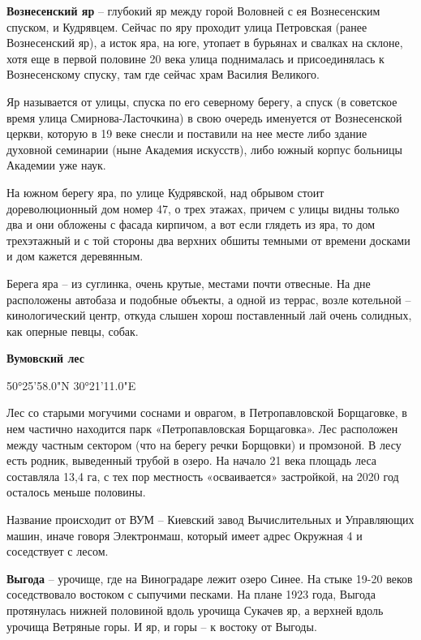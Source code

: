 \medskip

\textbf{Вознесенский яр} – глубокий яр между горой Воловней с ея Вознесенским спуском, и Кудрявцем. Сейчас по яру проходит улица Петровская (ранее Вознесенский яр), а исток яра, на юге, утопает в бурьянах и свалках на склоне, хотя еще в первой половине 20 века улица поднималась и присоединялась к Вознесенскому спуску, там где сейчас храм Василия Великого. 

Яр называется от улицы, спуска по его северному берегу, а спуск (в советское время улица Смирнова-Ласточкина) в свою очередь именуется от Вознесенской церкви, которую в 19 веке снесли и поставили на нее месте либо здание духовной семинарии (ныне Академия искусств), либо южный корпус больницы Академии уже наук.

На южном берегу яра, по улице Кудрявской, над обрывом стоит дореволюционный дом номер 47, о трех этажах, причем с улицы видны только два и они обложены с фасада кирпичом, а вот если глядеть из яра, то дом трехэтажный и с той стороны два верхних обшиты темными от времени досками и дом кажется деревянным.

Берега яра – из суглинка, очень крутые, местами почти отвесные. На дне расположены автобаза и подобные объекты, а одной из террас, возле котельной – кинологический центр, откуда слышен хорош поставленный лай очень солидных, как оперные певцы, собак.\\

\medskip

\textbf{Вумовский лес}

50°25'58.0"N 30°21'11.0"E

Лес со старыми могучими соснами и оврагом, в Петропавловской Борщаговке, в нем частично находится парк «Петропавловская Борщаговка». Лес расположен между частным сектором (что на берегу речки Борщовки) и промзоной. В лесу есть родник, выведенный трубой в озеро. На начало 21 века площадь леса составляла 13,4 га, с тех пор местность «осваивается» застройкой, на 2020 год осталось меньше половины.

Название происходит от ВУМ – Киевский завод Вычислительных и Управляющих машин, иначе говоря Электронмаш, который имеет адрес Окружная 4 и соседствует с лесом.\\

\medskip


\textbf{Выгода} – урочище, где на Виноградаре лежит озеро Синее. На стыке 19-20 веков соседствовало востоком с сыпучими песками. На плане 1923 года, Выгода протянулась нижней половиной вдоль урочища Сукачев яр, а верхней вдоль урочища Ветряные горы. И яр, и горы – к востоку от Выгоды.\\ 


